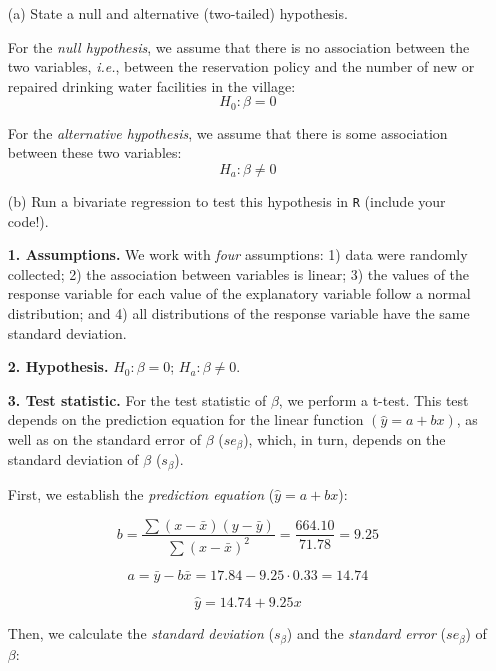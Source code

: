 \documentclass[12pt,letterpaper]{article}
\begin{document}
	\vspace{.5cm}

	\newpage
	
	\begin{enumerate}
	\item [(a)] State a null and alternative (two-tailed) hypothesis. 
	
	For the \textit{null hypothesis}, we assume that there is no association between the two variables, \textit{i.e.}, between the reservation policy and the number of new or repaired drinking water facilities in the village:
	$$H_0: \beta = 0$$
	
	For the \textit{alternative hypothesis}, we assume that there is some association between these two variables:
	$$H_a: \beta \neq 0$$
	
	\vspace{0.5cm}
	
	\item [(b)] Run a bivariate regression to test this hypothesis in \texttt{R} (include your code!).
	
	\textbf{1. Assumptions.} We work with \textit{four} assumptions: 1) data were randomly collected; 2) the association between variables is linear; 3) the values of the response variable for each value of the explanatory variable follow a normal distribution; and 4) all distributions of the response variable have the same standard deviation.
	
	\textbf{2. Hypothesis.} $H_0: \beta = 0$; $H_a: \beta \neq 0$.
	
	\textbf{3. Test statistic.} For the test statistic of $\beta$, we perform a t-test. This test depends on the prediction equation for the linear function $(\hat{y}=a+bx)$, as well as on the standard error of $\beta$ ($se_\beta$), which, in turn, depends on the standard deviation of $\beta$ ($s_\beta$).
	
	First, we establish the \textit{prediction equation} ($\hat{y}=a+bx$):
	
	$$b = \frac{\sum (x-\bar{x})(y-\bar{y})}{\sum (x-\bar{x})^2} = \frac{664.10}{71.78} = 9.25$$
	
	$$a = \bar{y} - b\bar{x} = 17.84 - 9.25 \cdot 0.33 = 14.74$$
	
	$$\hat{y} = 14.74 + 9.25x$$
	
		
	
	Then, we calculate the \textit{standard deviation} ($s_\beta$) and the \textit{standard error} ($se_\beta$) of $\beta$:
	

\end{enumerate}
\end{document}
